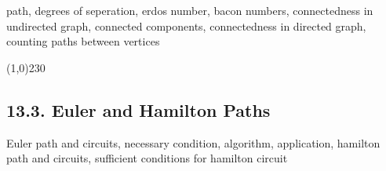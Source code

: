 path, degrees of seperation, erdos number, bacon numbers, connectedness in undirected graph, connected components, connectedness in directed graph, counting paths between vertices

\begin{center}
\line(1,0){230}
\end{center}

\subsection*{13.3. Euler and Hamilton Paths}

Euler path and circuits, necessary condition, algorithm, application,
hamilton path and circuits, sufficient conditions for hamilton circuit

